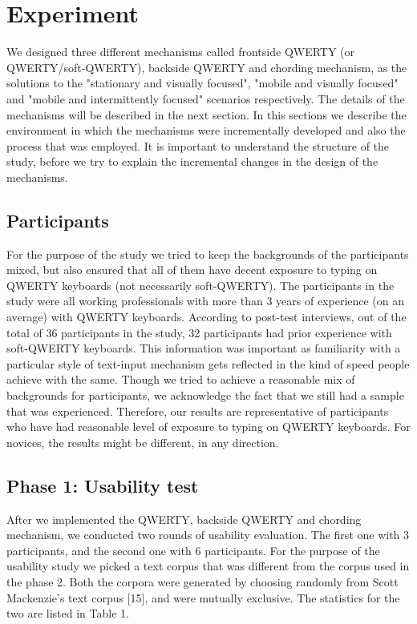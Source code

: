 \section{Experiment}

We designed three different mechanisms called frontside QWERTY (or QWERTY/soft-QWERTY), backside QWERTY and chording mechanism, as the solutions to the "stationary and visually focused", "mobile and visually focused" and "mobile and intermittently focused" scenarios respectively. The details of the mechanisms will be described in the next section. In this sections we describe the environment in which the mechanisms were incrementally developed and also the process that was employed. It is important to understand the structure of the study, before we try to explain the incremental changes in the design of the mechanisms.

\subsection{Participants}

For the purpose of the study we tried to keep the backgrounds of the
participants mixed, but also ensured that all of them have decent
exposure to typing on QWERTY keyboards (not necessarily
soft-QWERTY). The participants in the study were all working
professionals with more than 3 years of experience (on an average)
with QWERTY keyboards. According to post-test interviews, out of the
total of 36 participants in the study, 32 participants had prior
experience with soft-QWERTY keyboards. This information was important
as familiarity with a particular style of text-input mechanism gets
reflected in the kind of speed people achieve with the same. Though we
tried to achieve a reasonable mix of backgrounds for participants, we
acknowledge the fact that we still had a sample that was
experienced. Therefore, our results are representative of participants
who have had reasonable level of exposure to typing on QWERTY
keyboards. For novices, the results might be different, in any
direction.

\subsection{Phase 1: Usability test}

After we implemented the QWERTY, backside QWERTY and chording
mechanism, we conducted two rounds of usability evaluation. The first
one with 3 participants, and the second one with 6 participants. For
the purpose of the usability study we picked a text corpus that was
different from the corpus used in the phase 2. Both the corpora were
generated by choosing randomly from Scott Mackenzie's text corpus
[15], and were mutually exclusive. The statistics for the two
are listed in Table 1.


